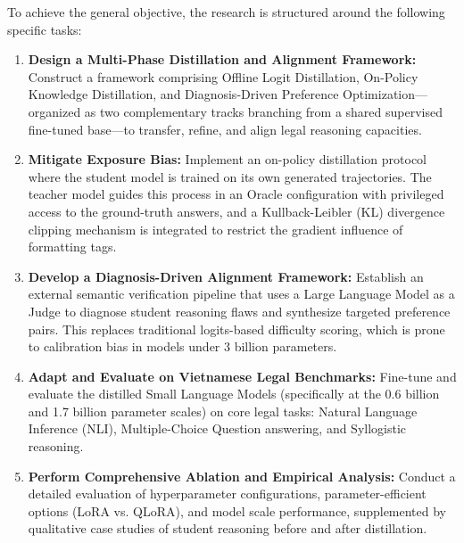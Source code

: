 To achieve the general objective, the research is structured around the following specific tasks:
\begin{enumerate}
    \item \textbf{Design a Multi-Phase Distillation and Alignment Framework:} Construct a framework comprising Offline Logit Distillation, On-Policy Knowledge Distillation, and Diagnosis-Driven Preference Optimization---organized as two complementary tracks branching from a shared supervised fine-tuned base---to transfer, refine, and align legal reasoning capacities.
    \item \textbf{Mitigate Exposure Bias:} Implement an on-policy distillation protocol where the student model is trained on its own generated trajectories. The teacher model guides this process in an Oracle configuration with privileged access to the ground-truth answers, and a Kullback-Leibler (KL) divergence clipping mechanism is integrated to restrict the gradient influence of formatting tags.
    \item \textbf{Develop a Diagnosis-Driven Alignment Framework:} Establish an external semantic verification pipeline that uses a Large Language Model as a Judge to diagnose student reasoning flaws and synthesize targeted preference pairs. This replaces traditional logits-based difficulty scoring, which is prone to calibration bias in models under 3 billion parameters.
    \item \textbf{Adapt and Evaluate on Vietnamese Legal Benchmarks:} Fine-tune and evaluate the distilled Small Language Models (specifically at the 0.6 billion and 1.7 billion parameter scales) on core legal tasks: Natural Language Inference (NLI), Multiple-Choice Question answering, and Syllogistic reasoning.
    \item \textbf{Perform Comprehensive Ablation and Empirical Analysis:} Conduct a detailed evaluation of hyperparameter configurations, parameter-efficient options (LoRA vs. QLoRA), and model scale performance, supplemented by qualitative case studies of student reasoning before and after distillation.
\end{enumerate}
